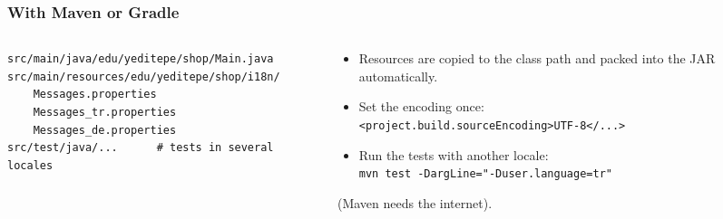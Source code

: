 \documentclass[aspectratio=169,10pt,compress]{beamer}
\begin{document}
\begin{frame}[t,fragile] \frametitle{With Maven or Gradle}
  \begin{columns}[T]
    \begin{column}{0.48\textwidth}


\begin{lstlisting}[style=codesnippet, language={}, basicstyle=\ttfamily\scriptsize]
src/main/java/edu/yeditepe/shop/Main.java
src/main/resources/edu/yeditepe/shop/i18n/
    Messages.properties
    Messages_tr.properties
    Messages_de.properties
src/test/java/...      # tests in several locales
\end{lstlisting}


    \end{column}
    \begin{column}{0.48\textwidth}
      \begin{itemize}\small
        \item Resources are copied to the class path and packed into the JAR automatically.
        \item Set the encoding once:\\ \texttt{<project.build.sourceEncoding>UTF-8</...>}
        \item Run the tests with another locale:\\ \texttt{mvn test -DargLine="-Duser.language=tr"}
      \end{itemize}
      \small {} (Maven needs the internet).
    \end{column}
  \end{columns}
\end{frame}

\end{document}
